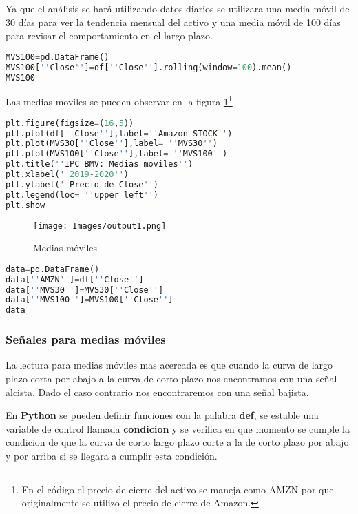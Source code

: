\documentclass[letterpaper,12pt,oneside]{book}
\begin{document}
Ya que el análisis se hará utilizando datos diarios se utilizara una media móvil de 30 días para ver la tendencia mensual del activo y una media móvil de 100 días para revisar el comportamiento en el largo plazo.


\begin{lstlisting}[language=Python]
MVS100=pd.DataFrame()
MVS100[''Close'']=df[''Close''].rolling(window=100).mean()
MVS100
\end{lstlisting}

Las medias moviles se pueden observar en la figura \ref{fig:m2}\footnote{En el código el precio de cierre del activo se maneja como AMZN por que originalmente se utilizo el precio de cierre de Amazon.}


\begin{lstlisting}[language=Python]
plt.figure(figsize=(16,5))
plt.plot(df[''Close''],label=''Amazon STOCK'')
plt.plot(MVS30[''Close''],label= ''MVS30'')
plt.plot(MVS100[''Close''],label= ''MVS100'')
plt.title(''IPC BMV: Medias moviles'')
plt.xlabel(''2019-2020'')
plt.ylabel(''Precio de Close'')
plt.legend(loc= ''upper left'')
plt.show
\end{lstlisting}


\begin{figure}[ht]
	\centering
	\texttt{[image: Images/output1.png]}
	\caption{Medias móviles}
	\label{fig:m2}
\end{figure}

\begin{lstlisting}[language=Python]
data=pd.DataFrame()
data[''AMZN'']=df[''Close'']
data[''MVS30'']=MVS30[''Close'']
data[''MVS100'']=MVS100[''Close'']
data
\end{lstlisting}


\subsubsection{Señales para medias móviles}

La lectura para medias móviles mas acercada es que cuando la curva de largo plazo corta por abajo a la curva de corto plazo nos encontramos con una señal alcista. Dado el caso contrario nos encontraremos con una señal bajista.

En \textbf{Python} se pueden definir funciones con la palabra \textbf{def}, se estable una variable de control llamada \textbf{condicion} y se verifica en que momento se cumple la condicion de que la curva de corto largo plazo corte a la de corto plazo por abajo y por arriba si se llegara a cumplir esta condición.
\end{document}
